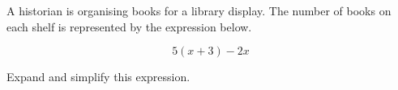 \begin{question}
\noindent A historian is organising books for a library display. The number of books on each shelf is represented by the expression below.

\[ 5(x + 3) - 2x \]

\noindent Expand and simplify this expression.
\vspace{4cm}
\end{question}